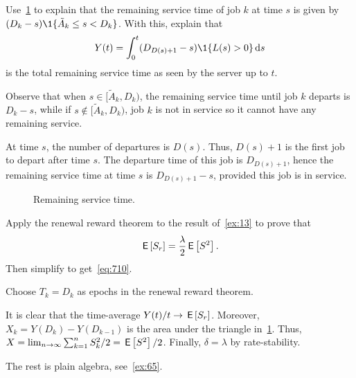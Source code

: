 \documentclass[companion]{subfiles}
\begin{document}
\begin{exercise}
 Use~\cref{fig:mg1remainingservicetime} to explain that the remaining service time of job $k$ at time $s$ is given by
$(D_k-s)\1{\tilde A_k \leq s < D_k}$.
With this, explain that
 \begin{equation*}
 Y(t) = \int_0^t (D_{D(s)+1}-s)\1{L(s) > 0} \d s
 \end{equation*}
is the total remaining service time as seen by the server up to $t$. 
\begin{solution}
 Observe that when $s\in [\tilde A_k, D_k)$, the remaining service time until job $k$ departs is $D_k-s $, while if $s\not \in [\tilde A_k, D_k)$, job $k$ is not in service so it cannot have any remaining service.

 At time $s$, the number of departures is $D(s)$.
 Thus, $D(s)+1$ is the first job to depart after time $s$.
 The departure time of this job is $D_{D(s)+1}$, hence the remaining service time at time $s$ is $D_{D(s)+1}-s$, provided this job is in service.
\end{solution}
\end{exercise}


\begin{figure}[htb]
 \centering
{}

 \caption{Remaining service time.}
 \label{fig:mg1remainingservicetime}
\end{figure}

\begin{exercise}
Apply the renewal reward theorem to the result of~\cref{ex:13} to prove that 
\begin{equation}\label{eq:34}
\,\mathsf{E}\left[S_r\right] = \frac{\lambda}2 \,\mathsf{E}\left[S^2\right]. 
\end{equation}
Then simplify to get~\cref{eq:710}. 
\begin{hint}
 Choose $T_k=D_k$ as epochs in the renewal reward theorem.
\end{hint}
\begin{solution}
 It is clear that the time-average $Y(t)/t \to \,\mathsf{E}\left[S_r\right]$.
 Moreover, $X_k = Y(D_k) - Y(D_{k-1})$ is the area under the triangle in~\cref{fig:mg1remainingservicetime}.
 Thus, $X=\lim_{n\to\infty} \sum_{k=1}^n S_k^2/ 2 = \,\mathsf{E}\left[S^2\right]/2$.
 Finally, $\delta = \lambda$ by rate-stability.

 The rest is plain algebra, see~\cref{ex:65}.
\end{solution}
\end{exercise}
\end{document}
